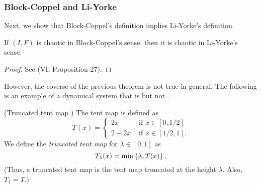 \documentclass[12pt,twoside,draft]{book}
\begin{document}
\subsubsection*{Block-Coppel and Li-Yorke}
Next, we show that Block-Coppel's definition implies Li-Yorke's definition.
\begin{theorem}
  \citep{blockcoppel}
  If $(I,F)$ is chaotic in Block-Coppel's sense, then it is chaotic in Li-Yorke's sense.
  \label{thm:devaney-liyorke}
  \begin{proof}
    See \citet{blockcoppel} (VI; Proposition 27).
  \end{proof}
\end{theorem}
However, the coverse of the previous theorem is not true in general.
The following is an example of a dynamical system that is \liy but not \blcp.
\begin{example}
  (Truncated tent map \citep{aulbach})
  The tent map is defined as
  \begin{equation*}
    T(x) = 
    \begin{cases}
      2x     &\mbox{ if } x \in [0,1/2] \\
      2 - 2x &\mbox{ if } x \in [1/2,1].
    \end{cases}
  \end{equation*}
  We define the \textit{truncated tent map} for $\lambda \in [0,1]$ as 
  \begin{equation*}
    T_\lambda(x) = \min\left \{ \lambda, T(x) \right \}.
  \end{equation*}
  (Thus, a truncated tent map is the tent map truncated at the height $\lambda$.
  Also, $T_1 = T$.)

  \begin{figure}[th]
    \centering
\end{figure}
\end{example}
\end{document}
